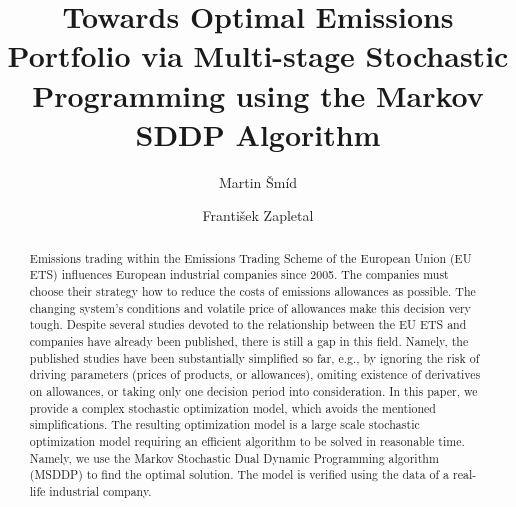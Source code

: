 \documentclass[3p,times]{elsarticle}
\begin{document}
\begin{frontmatter}


\author{Martin \v Sm\' id}
\author{Franti\v sek Zapletal}

\dochead{}

\title{Towards Optimal Emissions Portfolio via Multi-stage Stochastic Programming using the Markov SDDP Algorithm}

\address{Czech Academy of Sciences, Institute of Information Theory and Automation, Pod Vod\' arenskou v\v e\v z\' i 4, Prague, Czech Republic, smid@cas.utia.cz  }
\address{V\v SB -- Technical University of Ostrava, Sokolska 33, Ostrava, Czech Republic,
                frantisek.zapletal@vsb.cz  }

\begin{abstract}

Emissions trading within the Emissions Trading Scheme of the European Union (EU ETS) influences European industrial companies since 2005. The companies must choose their strategy how to reduce the costs of emissions allowances as possible. The changing system’s conditions and volatile price of allowances make this decision very tough. Despite several studies devoted to the relationship between the EU ETS and companies have already been published, there is still a gap in this field. Namely, the published studies have been substantially simplified so far, e.g., by ignoring the risk of driving parameters (prices of products, or allowances), omiting existence of derivatives on allowances, or taking only one decision period into consideration. In this paper, we provide a complex stochastic optimization model, which avoids the mentioned simplifications. The resulting optimization model is a large scale stochastic optimization model requiring an efficient algorithm to be solved in reasonable time. Namely, we use the Markov Stochastic Dual Dynamic Programming algorithm (MSDDP) to find the optimal solution. The model is verified using the data of a real-life industrial company. 


\end{abstract}
\end{frontmatter}
\end{document}
